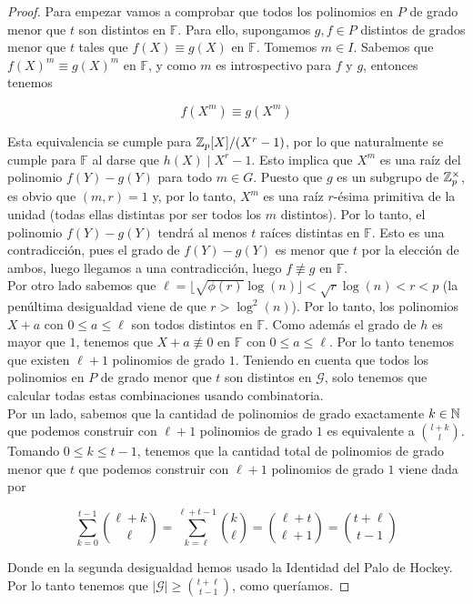\begin{proof}
	Para empezar vamos a comprobar que todos los polinomios en $P$ de grado menor que $t$ son distintos en $\mathbb{F}$. Para ello, supongamos $g, f \in P$ distintos de grados menor que $t$ tales que $f(X) \equiv g(X)$ en $\mathbb{F}$. Tomemos $m \in I$. Sabemos que $f(X)^m \equiv g(X)^m$ en $\mathbb{F}$, y como $m$ es introspectivo para $f$ y $g$, entonces tenemos
	
	\[ f(X^m) \equiv g(X^m) \]
	
	Esta equivalencia se cumple para $\mathbb{Z}_p[X]/(X^r - 1)$, por lo que naturalmente se cumple para $\mathbb{F}$ al darse que $h(X) \mid X^r - 1$. Esto implica que $X^m$ es una raíz del polinomio $f(Y) - g(Y)$ para todo $m \in G$. Puesto que $g$ es un subgrupo de $\mathbb{Z}_p^\times$, es obvio que $(m, r) = 1$ y, por lo tanto, $X^m$ es una raíz $r$-ésima primitiva de la unidad (todas ellas distintas por ser todos los $m$ distintos). Por lo tanto, el polinomio $f(Y) - g(Y)$ tendrá al menos $t$ raíces distintas en $\mathbb{F}$. Esto es una contradicción, pues el grado de $f(Y) - g(Y)$ es menor que $t$ por la elección de ambos, luego llegamos a una contradicción, luego $f \not\equiv g$ en $\mathbb{F}$.\\
	
	Por otro lado sabemos que $\ell = \lfloor \sqrt{\phi(r)}\log(n) \rfloor < \sqrt{r}\log(n) < r < p$ (la penúltima desigualdad viene de que $r > \log^2(n)$). Por lo tanto, los polinomios $X + a$ con $0 \leq a \leq \ell$ son todos distintos en $\mathbb{F}$. Como además el grado de $h$ es mayor que $1$, tenemos que $X + a \not\equiv 0$ en $\mathbb{F}$ con $0 \leq a \leq \ell$. Por lo tanto tenemos que existen $\ell + 1$ polinomios de grado $1$. Teniendo en cuenta que todos los polinomios en $P$ de grado menor que $t$ son distintos en $\mathcal{G}$, solo tenemos que calcular todas estas combinaciones usando combinatoria.\\
	
	Por un lado, sabemos que la cantidad de polinomios de grado exactamente $k \in \mathbb{N}$ que podemos construir con $\ell + 1$ polinomios de grado $1$ es equivalente a $\binom{l+k}{l}$. Tomando $0 \leq k \leq t-1$, tenemos que la cantidad total de polinomios de grado menor que $t$ que podemos construir con $\ell + 1$ polinomios de grado $1$ viene dada por
	
	\[ \sum_{k=0}^{t-1}\binom{\ell+k}{\ell} = \sum_{k=\ell}^{\ell+t-1}\binom{k}{\ell} = \binom{\ell + t}{\ell + 1} = \binom{t + \ell}{t - 1} \]
	
	Donde en la segunda desigualdad hemos usado la Identidad del Palo de Hockey. Por lo tanto tenemos que $|\mathcal{G}| \geq \binom{t + \ell}{t - 1}$, como queríamos.
\end{proof}

